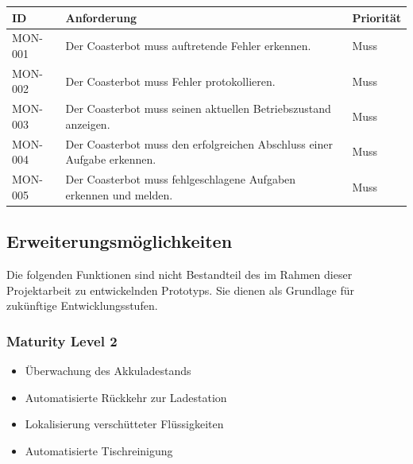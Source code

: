 \begin{longtable}[]{@{}
  >{\raggedright\arraybackslash}p{}
  >{\raggedright\arraybackslash}p{}
  >{\raggedright\arraybackslash}p{}@{}}
\toprule\noalign{}
\begin{minipage}[b]{\linewidth}\raggedright
ID
\end{minipage} & \begin{minipage}[b]{\linewidth}\raggedright
Anforderung
\end{minipage} & \begin{minipage}[b]{\linewidth}\raggedright
Priorität
\end{minipage} \\
\midrule\noalign{}
\endhead
\bottomrule\noalign{}
\endlastfoot
MON-001 & Der Coasterbot muss auftretende Fehler erkennen. & Muss \\
MON-002 & Der Coasterbot muss Fehler protokollieren. & Muss \\
MON-003 & Der Coasterbot muss seinen aktuellen Betriebszustand anzeigen.
& Muss \\
MON-004 & Der Coasterbot muss den erfolgreichen Abschluss einer Aufgabe
erkennen. & Muss \\
MON-005 & Der Coasterbot muss fehlgeschlagene Aufgaben erkennen und
melden. & Muss \\
\end{longtable}

\subsection{Erweiterungsmöglichkeiten}\label{erweiterungsmuxf6glichkeiten}

Die folgenden Funktionen sind nicht Bestandteil des im Rahmen dieser
Projektarbeit zu entwickelnden Prototyps. Sie dienen als Grundlage für
zukünftige Entwicklungsstufen.

\subsubsection{Maturity Level 2}\label{maturity-level-2}

\begin{itemize}
\tightlist
\item
  Überwachung des Akkuladestands
\item
  Automatisierte Rückkehr zur Ladestation
\item
  Lokalisierung verschütteter Flüssigkeiten
\item
  Automatisierte Tischreinigung
\end{itemize}


